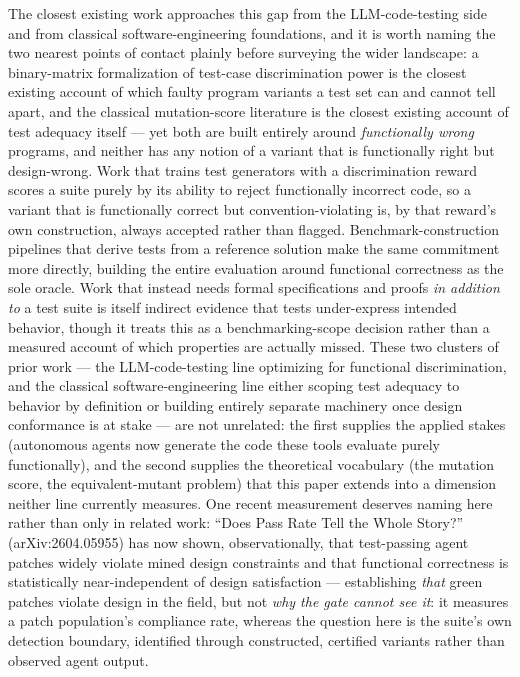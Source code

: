 \documentclass[11pt]{article}
\begin{document}
The closest existing work approaches this gap from the LLM-code-testing side and from classical software-engineering foundations, and it is worth naming the two nearest points of contact plainly before surveying the wider landscape: a binary-matrix formalization of test-case discrimination power is the closest existing account of which faulty program variants a test set can and cannot tell apart, and the classical mutation-score literature is the closest existing account of test adequacy itself --- yet both are built entirely around \emph{functionally wrong} programs, and neither has any notion of a variant that is functionally right but design-wrong. Work that trains test generators with a discrimination reward scores a suite purely by its ability to reject functionally incorrect code, so a variant that is functionally correct but convention-violating is, by that reward's own construction, always accepted rather than flagged. Benchmark-construction pipelines that derive tests from a reference solution make the same commitment more directly, building the entire evaluation around functional correctness as the sole oracle. Work that instead needs formal specifications and proofs \emph{in addition to} a test suite is itself indirect evidence that tests under-express intended behavior, though it treats this as a benchmarking-scope decision rather than a measured account of which properties are actually missed. These two clusters of prior work --- the LLM-code-testing line optimizing for functional discrimination, and the classical software-engineering line either scoping test adequacy to behavior by definition or building entirely separate machinery once design conformance is at stake --- are not unrelated: the first supplies the applied stakes (autonomous agents now generate the code these tools evaluate purely functionally), and the second supplies the theoretical vocabulary (the mutation score, the equivalent-mutant problem) that this paper extends into a dimension neither line currently measures. One recent measurement deserves naming here rather than only in related work: ``Does Pass Rate Tell the Whole Story?'' (arXiv:2604.05955) has now shown, observationally, that test-passing agent patches widely violate mined design constraints and that functional correctness is statistically near-independent of design satisfaction --- establishing \emph{that} green patches violate design in the field, but not \emph{why the gate cannot see it}: it measures a patch population's compliance rate, whereas the question here is the suite's own detection boundary, identified through constructed, certified variants rather than observed agent output.
\end{document}

